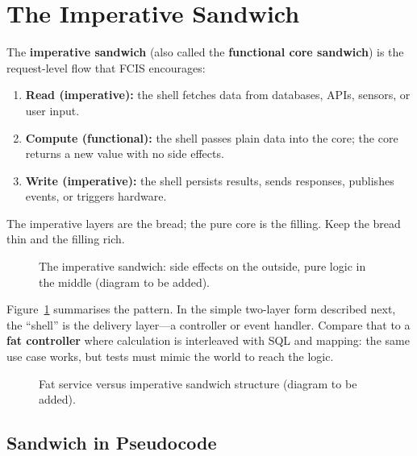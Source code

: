 \section{The Imperative Sandwich}
\label{sec:fcis_imperative_sandwich}

The \textbf{imperative sandwich} (also called the \textbf{functional core sandwich}) is the request-level flow that FCIS encourages:\autocite{seemannFcis,googleFcis2025}
\begin{enumerate}
    \item \textbf{Read (imperative):} the shell fetches data from databases, APIs, sensors, or user input.
    \item \textbf{Compute (functional):} the shell passes plain data into the core; the core returns a new value with no side effects.
    \item \textbf{Write (imperative):} the shell persists results, sends responses, publishes events, or triggers hardware.
\end{enumerate}
The imperative layers are the bread; the pure core is the filling. Keep the bread thin and the filling rich.

\begin{figure}[htbp]
\centering
{}
\caption{The imperative sandwich: side effects on the outside, pure logic in the middle (diagram to be added).}
\label{fig:fcis_imperative_sandwich}
\end{figure}

Figure~\ref{fig:fcis_imperative_sandwich} summarises the pattern. In the simple two-layer form described next, the ``shell'' is the delivery layer---a controller or event handler. Compare that to a \textbf{fat controller} where calculation is interleaved with SQL and mapping: the same use case works, but tests must mimic the world to reach the logic.

\begin{figure}[htbp]
\centering
{}
\caption{Fat service versus imperative sandwich structure (diagram to be added).}
\label{fig:fcis_fat_vs_sandwich}
\end{figure}

\subsection{Sandwich in Pseudocode}
\label{sec:fcis_sandwich_pseudocode}

